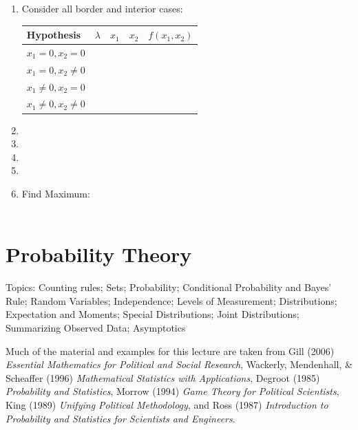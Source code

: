 \documentclass[]{book}
\theoremstyle{definition}
\theoremstyle{definition}
\theoremstyle{definition}
\theoremstyle{remark}
\begin{document}
\begin{enumerate}
\item Consider all border and interior cases:
\begin{center}
\begin{tabular}{|l|ccc|c|}
\hline
Hypothesis  & $\lambda$& $x_1$ & $x_2$ & $f(x_1, x_2)$\\
\hline
$x_1 = 0, x_2 = 0$  &\multicolumn{3}{l|}{\phantom{No Solution}}& \\
$x_1 = 0, x_2 \neq 0$  &\multicolumn{3}{l|}{\phantom{No Solution}}& \\
$x_1 \neq 0, x_2 = 0$  & \multicolumn{3}{l|}{\phantom{No Solution}}& \\
$x_1 \neq 0, x_2 \neq 0$ &  & \phantom{$\frac{4}{3}$} & \phantom{$\frac{4}{3}$} & \phantom{$\log\frac{7}{3}$}\\
\hline
\end{tabular}
\end{center}

\item[]
\item[]
\item[]
\item[]

\item  Find Maximum:\\
\\
\end{enumerate}

\chapter{Probability Theory}\label{probability-theory}

Topics: Counting rules; Sets; Probability; Conditional Probability and
Bayes' Rule; Random Variables; Independence; Levels of Measurement;
Distributions; Expectation and Moments; Special Distributions; Joint
Distributions; Summarizing Observed Data; Asymptotics

Much of the material and examples for this lecture are taken from Gill
(2006) \emph{Essential Mathematics for Political and Social Research},
Wackerly, Mendenhall, \& Scheaffer (1996)
\emph{Mathematical Statistics with Applications}, Degroot (1985)
\emph{Probability and Statistics}, Morrow (1994) \emph{Game Theory for
Political Scientists}, King (1989)
\emph{Unifying Political Methodology}, and Ross (1987)
\emph{Introduction to Probability
and Statistics for Scientists and Engineers}.
\end{document}
